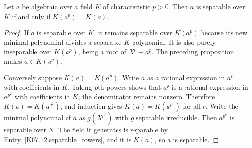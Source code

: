 \begin{theorem}
Let $a$ be algebraic over a field $K$ of characteristic $p>0$. Then $a$ is separable over $K$ if and only if $K(a^p)=K(a)$.
\end{theorem}
\begin{proof}
If $a$ is separable over $K$, it remains separable over $K(a^p)$ because its new minimal polynomial divides a separable $K$-polynomial. It is also purely inseparable over $K(a^p)$, being a root of $X^p-a^p$. The preceding proposition makes $a\in K(a^p)$.

Conversely suppose $K(a)=K(a^p)$. Write $a$ as a rational expression in $a^p$ with coefficients in $K$. Taking $p$th powers shows that $a^p$ is a rational expression in $a^{p^2}$ with coefficients in $K$; the denominator remains nonzero. Therefore $K(a)=K(a^{p^2})$, and induction gives $K(a)=K(a^{p^r})$ for all $r$. Write the minimal polynomial of $a$ as $g(X^{p^r})$ with $g$ separable irreducible. Then $a^{p^r}$ is separable over $K$. The field it generates is separable by Entry~\ref{K07.12.separable_towers}, and it is $K(a)$, so $a$ is separable.
\end{proof}

